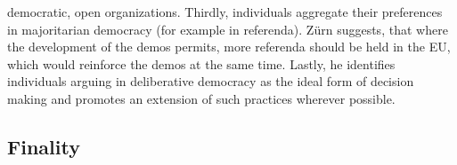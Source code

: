 democratic, open organizations. Thirdly, individuals aggregate their preferences in majoritarian democracy (for example in referenda). Zürn suggests, that where the development of the demos permits, more referenda should be held in the EU, which would reinforce the demos at the same time. Lastly, he identifies individuals arguing in deliberative democracy as the ideal form of decision making and promotes an extension of such practices wherever possible.
	

\subsection[Finality]{Finality} %

